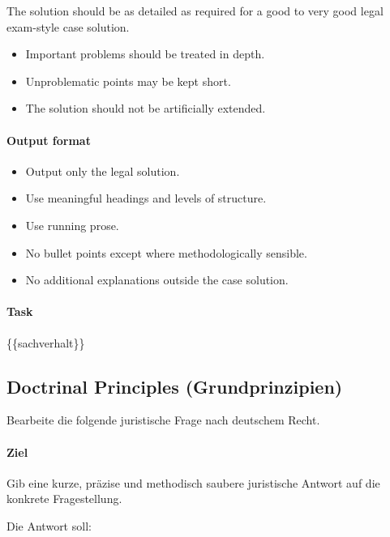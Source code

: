 \documentclass[11pt]{article}
\providecommand{\tightlist}{%
  \setlength{\itemsep}{0pt}\setlength{\parskip}{0pt}}
\begin{document}
The solution should be as detailed as required for a good to very good
legal exam-style case solution.

\begin{itemize}
\tightlist
\item
  Important problems should be treated in depth.
\item
  Unproblematic points may be kept short.
\item
  The solution should not be artificially extended.
\end{itemize}

\paragraph{\texorpdfstring{\textbf{Output
format}}{Output format}}\label{output-format}

\begin{itemize}
\tightlist
\item
  Output only the legal solution.
\item
  Use meaningful headings and levels of structure.
\item
  Use running prose.
\item
  No bullet points except where methodologically sensible.
\item
  No additional explanations outside the case solution.
\end{itemize}

\paragraph{\texorpdfstring{\textbf{Task}}{Task}}\label{task}

\{\{sachverhalt\}\}

\subsection{Doctrinal Principles
(Grundprinzipien)}\label{doctrinal-principles-grundprinzipien-1}

Bearbeite die folgende juristische Frage nach deutschem Recht.

\paragraph{Ziel}\label{ziel}

Gib eine kurze, präzise und methodisch saubere juristische Antwort auf
die konkrete Fragestellung.

Die Antwort soll:
\end{document}
